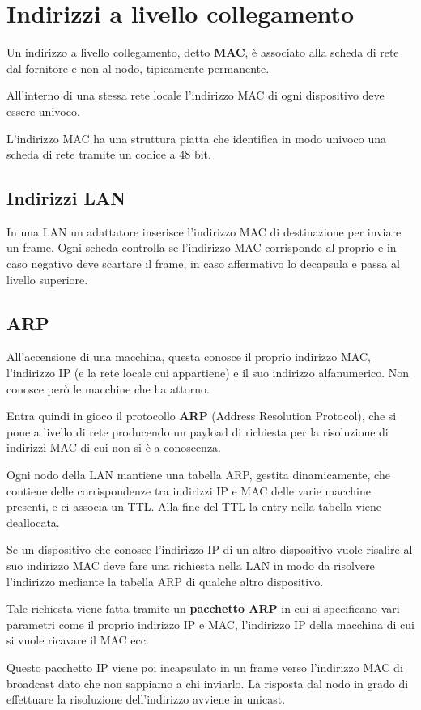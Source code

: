 \section{Indirizzi a livello collegamento}
Un indirizzo a livello collegamento, detto \textbf{MAC}, è associato
alla scheda di rete dal fornitore e non al nodo, tipicamente 
permanente.

All'interno di una stessa rete locale l'indirizzo MAC di ogni 
dispositivo deve essere univoco.

L'indirizzo MAC ha una struttura piatta che identifica in modo univoco
una scheda di rete tramite un codice a 48 bit.

\subsection{Indirizzi LAN}
In una LAN un adattatore inserisce l'indirizzo MAC di destinazione per
inviare un frame. Ogni scheda controlla se l'indirizzo MAC corrisponde
al proprio e in caso negativo deve scartare il frame, in caso 
affermativo lo decapsula e passa al livello superiore.

\subsection{ARP}
All'accensione di una macchina, questa conosce il proprio indirizzo 
MAC, l'indirizzo IP (e la rete locale cui appartiene) e il suo 
indirizzo alfanumerico. Non conosce però le macchine che ha attorno.

Entra quindi in gioco il protocollo \textbf{ARP} (Address Resolution
Protocol), che si pone a livello di rete producendo un payload di
richiesta per la risoluzione di indirizzi MAC di cui non si è a 
conoscenza.

Ogni nodo della LAN mantiene una tabella ARP, gestita dinamicamente,
che contiene delle corrispondenze tra indirizzi IP e MAC delle
varie macchine presenti, e ci associa un TTL. Alla fine del TTL 
la entry nella tabella viene deallocata.

Se un dispositivo che conosce l'indirizzo IP di un altro dispositivo
vuole risalire al suo indirizzo MAC deve fare una richiesta nella LAN
in modo da risolvere l'indirizzo mediante la tabella ARP di qualche
altro dispositivo.

Tale richiesta viene fatta tramite un \textbf{pacchetto ARP} in cui
si specificano vari parametri come il proprio indirizzo IP e MAC,
l'indirizzo IP della macchina di cui si vuole ricavare il MAC ecc.

Questo pacchetto IP viene poi incapsulato in un frame verso
l'indirizzo MAC di broadcast dato che non sappiamo a chi inviarlo.
La risposta dal nodo in grado di effettuare la risoluzione 
dell'indirizzo avviene in unicast.
